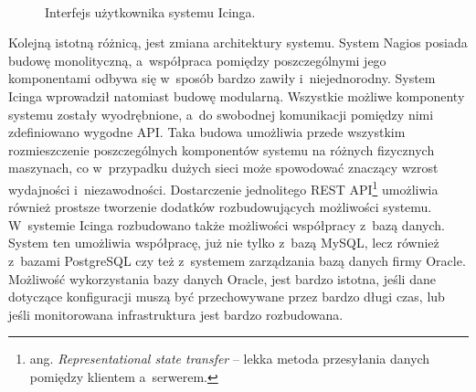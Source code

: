 \begin{figure}[h]
\label{fig:IcingaInterface}
\caption{Interfejs użytkownika systemu Icinga.}
\begin{center}
\\[0.1cm]
\end{center}
\end{figure}

Kolejną istotną różnicą, jest zmiana architektury systemu. System
Nagios posiada budowę monolityczną, a~współpraca pomiędzy
poszczególnymi jego komponentami odbywa się w~sposób bardzo zawiły
i~niejednorodny. System Icinga wprowadził natomiast budowę
modularną. Wszystkie możliwe komponenty systemu zostały wyodrębnione,
a~do swobodnej komunikacji pomiędzy nimi zdefiniowano wygodne
API. Taka budowa umożliwia przede wszystkim rozmieszczenie
poszczególnych komponentów systemu na różnych fizycznych maszynach, co
w~przypadku dużych sieci może spowodować znaczący wzrost wydajności
i~niezawodności. Dostarczenie jednolitego REST API\footnote{ang. {\em
    Representational state transfer} -- lekka metoda przesyłania
  danych pomiędzy klientem a~serwerem.} umożliwia również prostsze
tworzenie dodatków rozbudowujących możliwości systemu.  W~systemie
Icinga rozbudowano także możliwości współpracy z~bazą danych. System
ten umożliwia współpracę, już nie tylko z~bazą MySQL, lecz również
z~bazami PostgreSQL czy też z~systemem zarządzania bazą danych firmy
Oracle. Możliwość wykorzystania bazy danych Oracle, jest bardzo
istotna, jeśli dane dotyczące konfiguracji muszą być przechowywane
przez bardzo długi czas, lub jeśli monitorowana infrastruktura jest
bardzo rozbudowana.

